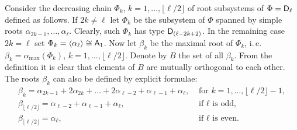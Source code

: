 
Consider the decreasing chain $\Phi_k$, $k=1,\ldots, \lfloor \ell/2 \rfloor$ of root subsystems of $\Phi=\mathsf{D}_\ell$ defined as follows.
If $2k \neq \ell$ let $\Phi_k$ be the subsystem of $\Phi$ spanned by simple roots $\alpha_{2k-1}, \ldots, \alpha_\ell$.
Clearly, such $\Phi_k$ has type $\mathsf{D}_{(\ell-2k+2)}$. 
In the remaining case $2k = \ell$ set $\Phi_k = \langle \alpha_\ell \rangle \cong \mathsf{A}_1$.
Now let $\beta_k$ be the maximal root of $\Phi_k$, i.\,e. $\beta_k = \alpha_\mathrm{max}(\Phi_k)$, $k=1,\ldots, \lfloor \ell/2 \rfloor$.
Denote by $B$ the set of all $\beta_k$. From the definition it is clear that elements of $B$ are mutually orthogonal to each other.
The roots $\beta_k$ can also be defined by explicit formulae:
\begin{align*}
 \beta_k =  \alpha_{2k-1} + 2\alpha_{2k}+ \ldots + 2\alpha_{\ell-2} + \alpha_{\ell-1} + \alpha_\ell, & \text{ for } k=1,\ldots,\lfloor\ell/2\rfloor-1, \\
 \beta_{\lfloor\ell/2\rfloor} = \alpha_{\ell-2}+\alpha_{\ell-1}+\alpha_\ell, & \text{ if $\ell$ is odd,} \\
 \beta_{\lfloor\ell/2\rfloor} = \alpha_\ell, & \text{ if $\ell$ is even.}
\end{align*}

